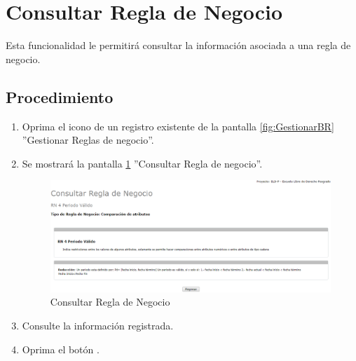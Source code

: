 \hypertarget{cv:consultarBR}{\section{Consultar Regla de Negocio}} \label{sec:consultarBR}

	Esta funcionalidad le permitirá consultar la información asociada a una regla de negocio.

		\subsection{Procedimiento}

			\begin{enumerate}
	
			\item Oprima el icono \IUConsultar{} de un registro existente de la pantalla \ref{fig:GestionarBR} ''Gestionar Reglas de negocio''.
	
			\item Se mostrará la pantalla \ref{fig:consultarBR} ''Consultar Regla de negocio''.
			
			\begin{figure}[htbp!]
				\begin{center}
					\includegraphics[scale=0.5]{roles/lider/reglasNegocio/pantallas/IU8-4consultarBR}
					\caption{Consultar Regla de Negocio}
					\label{fig:consultarBR}
				\end{center}
			\end{figure}
						
			\item Consulte la información registrada.
			
			\item Oprima el botón \IURegresar.
		\end{enumerate}